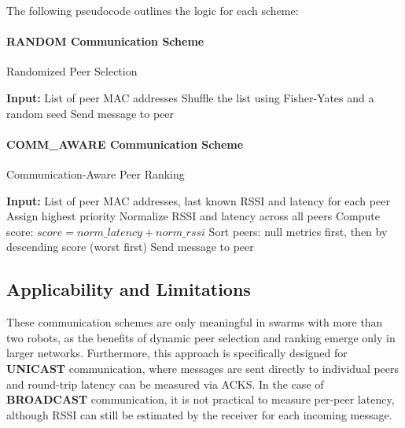 \documentclass[conference]{IEEEtran}
\begin{document}
The following pseudocode outlines the logic for each scheme:

\paragraph{RANDOM Communication Scheme}
\begin{algorithm}[H]
\caption{Randomized Peer Selection}
\begin{algorithmic}[1]
\State \textbf{Input:} List of peer MAC addresses
\State Shuffle the list using Fisher-Yates and a random seed
        \State Send message to peer
    \EndIf
\EndFor
\end{algorithmic}
\end{algorithm}

\paragraph{COMM\_AWARE Communication Scheme}
\begin{algorithm}[H]
\caption{Communication-Aware Peer Ranking}
\begin{algorithmic}[1]
\State \textbf{Input:} List of peer MAC addresses, last known RSSI and latency for each peer
        \State Assign highest priority
    \Else
        \State Normalize RSSI and latency across all peers
        \State Compute score: $score = norm\_latency + norm\_rssi$
    \EndIf
\EndFor
\State Sort peers: null metrics first, then by descending score (worst first)
        \State Send message to peer
    \EndIf
\EndFor
\end{algorithmic}
\end{algorithm}

\subsection{Applicability and Limitations}

These communication schemes are only meaningful in swarms with more than two robots, as the benefits of dynamic peer selection and ranking emerge only in larger networks. Furthermore, this approach is specifically designed for \textbf{UNICAST} communication, where messages are sent directly to individual peers and round-trip latency can be measured via ACKS. In the case of \textbf{BROADCAST} communication, it is not practical to measure per-peer latency, although RSSI can still be estimated by the receiver for each incoming message.
\end{document}
